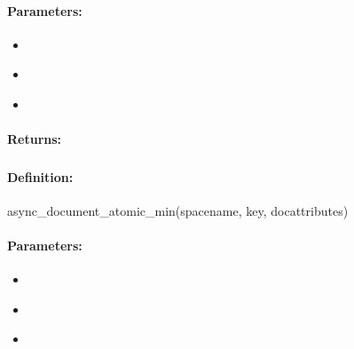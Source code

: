 \paragraph{Parameters:}
\begin{itemize}[noitemsep]
\item {}\\

\item {}\\

\item {}\\

\end{itemize}

\paragraph{Returns:}


\pagebreak
\subsubsection{}
\label{api:ruby:async_document_atomic_min}


\paragraph{Definition:}
\begin{rubycode}
async_document_atomic_min(spacename, key, docattributes)
\end{rubycode}

\paragraph{Parameters:}
\begin{itemize}[noitemsep]
\item {}\\

\item {}\\

\item {}\\

\end{itemize}

